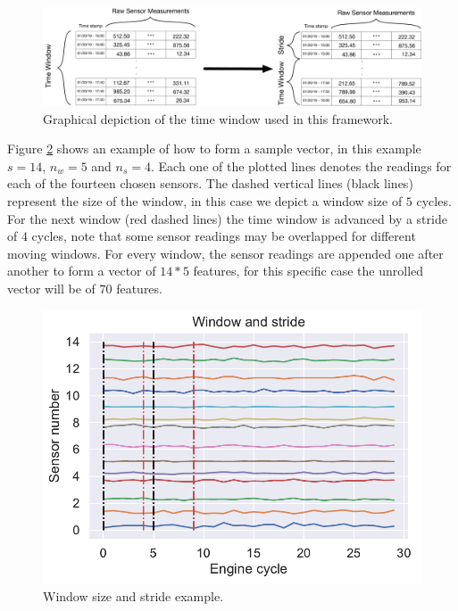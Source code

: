 \documentclass[preprint,12pt]{elsarticle}%
\begin{document}
\begin{figure}[H]
\begin{center}
\includegraphics[scale=0.2]{Figures/time_window_example.pdf}
\caption{Graphical depiction of the time window used in this framework.}
\label{fig:moving_window}
\end{center}
\end{figure}

Figure \ref{fig:window_stride_arrows} shows an example of how to form a sample vector, in this example $s=14$, $n_w=5$ and $n_s=4$. Each one of the plotted lines denotes the readings for each of the fourteen chosen sensors. The dashed vertical lines (black lines) represent the size of the window, in this case we depict a window size of $5$ cycles. For the next window (red dashed lines) the time window is advanced by a stride of $4$ cycles, note that some sensor readings may be overlapped for different moving windows. For every window, the sensor readings are appended one after another to form a vector of $14*5$ features, for this specific case the unrolled vector will be of $70$ features.

\begin{figure}[H]
\begin{center}
\includegraphics[scale=0.8]{Figures/window_stride.pdf}
\caption{Window size and stride example.}
\label{fig:window_stride_arrows}
\end{center}
\end{figure}
\end{document}

